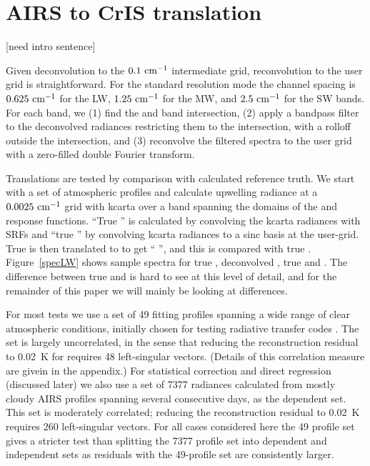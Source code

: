 \documentclass[11pt]{article}
\begin{document}
\FloatBarrier
\section{AIRS to CrIS translation}
\label{airs2cris}

[need intro sentence]


Given {\airs} deconvolution to the $0.1~\mbox{cm$^{-1}$}$ intermediate grid,
reconvolution to the {\cris} user grid is straightforward.  For the
{\cris} standard resolution mode the channel spacing is $0.625~\mbox{cm$^{-1}$}$
for the LW, $1.25~\mbox{cm$^{-1}$}$ for the MW, and $2.5~\mbox{cm$^{-1}$}$ for the SW bands.
For each {\cris} band, we (1) find the {\airs} and {\cris} band
intersection, (2) apply a bandpass filter to the deconvolved {\airs}
radiances restricting them to the intersection, with a rolloff
outside the intersection, and (3) reconvolve the filtered spectra to
the {\cris} user grid with a zero-filled double Fourier transform.

Translations are tested by comparison with calculated reference
truth.  We start with a set of atmospheric profiles and calculate
upwelling radiance at a $0.0025~\mbox{cm$^{-1}$}$ grid with kcarta \cite{kcarta1}
over a band spanning the domains of the {\airs} and {\cris} response
functions.  ``True {\airs}'' is calculated by convolving the kcarta
radiances with {\airs} SRFs and ``true {\cris}'' by convolving
kcarta radiances to a sinc basis at the {\cris} user-grid.  True
{\airs} is then translated to {\cris} to get ``{\airs} {\cris}'',
and this is compared with true {\cris}.  Figure~\ref{specLW} shows
sample spectra for true {\airs}, deconvolved {\airs}, true {\cris}
and {\airs} {\cris}.  The difference between true {\cris} and
{\airs} {\cris} is hard to see at this level of detail, and for the
remainder of this paper we will mainly be looking at differences.

For most tests we use a set of 49 fitting profiles spanning a wide
range of clear atmospheric conditions, initially chosen for testing
radiative transfer codes \cite{sarta1,sarta2}.  The set is largely
uncorrelated, in the sense that reducing the reconstruction residual
to 0.02~K for requires 48 left-singular vectors.  (Details of this
correlation measure are givein in the appendix.)  For statistical
correction and direct regression (discussed later) we also use a set
of 7377 radiances calculated from mostly cloudy AIRS profiles
spanning several consecutive days, as the dependent set.  This set
is moderately correlated; reducing the reconstruction residual to
0.02~K requires 260 left-singular vectors.  For all cases considered
here the 49 profile set gives a stricter test than splitting the
7377 profile set into dependent and independent sets as residuals
with the 49-profile set are consistently larger.
\end{document}
